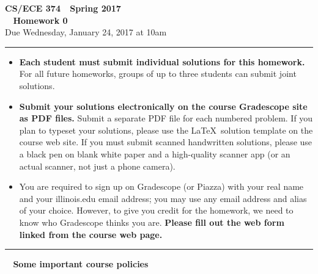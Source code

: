 \documentclass[11pt]{article}
\begin{document}
\thispagestyle{empty}

\begin{center}
\Large\textbf{CS/ECE 374 \,\decosix\,  Spring 2017}%
\\
\LARGE\textbf{\decothreeleft~ Homework 0 ~\decothreeright}%
\\[0.5ex]
\large Due Wednesday, January 24, 2017 at 10am
\end{center}

\bigskip
\hrule
\bigskip
\begin{itemize}

\item
\textbf{Each student must submit individual solutions for this homework.}   For all future homeworks, groups of up to three students can submit joint solutions.

\item \textbf{Submit your solutions electronically on the course
    Gradescope site as PDF files.}  Submit a separate PDF file for
  each numbered problem.  If you plan to typeset your solutions,
  please use the \LaTeX\ solution template on the course web site.  If
  you must submit scanned handwritten solutions, please use a black
  pen on blank white paper and a high-quality scanner app (or an
  actual scanner, not just a phone camera).

\item You are  required to sign up on Gradescope (or Piazza)
  with your real name and your illinois.edu email address; you may use
  any email address and alias of your choice.  However, to give you
  credit for the homework, we need to know who Gradescope thinks you
  are.  \textbf{Please fill out the web form linked from the course
    web page.}

\end{itemize}

\bigskip
\hrule
\bigskip

\begin{center}
\Large \textbf{\color{Red}\lefthand~
	Some important course policies
	~\righthand}\\
\end{center}
\end{document}
